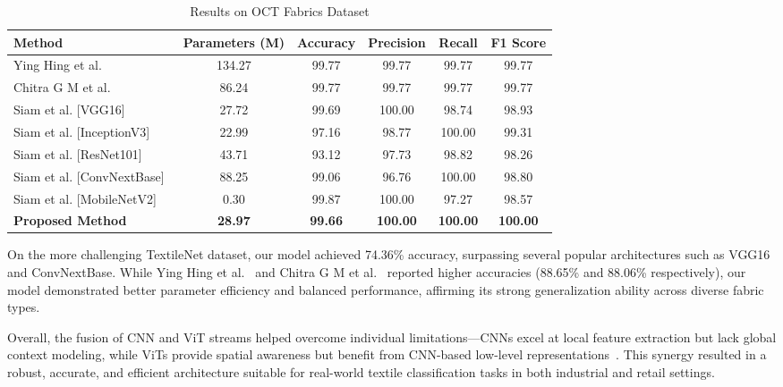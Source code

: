\begin{table}[h]
\centering
\caption{Results on OCT Fabrics Dataset}
\label{tab:oct_results}
\begin{adjustbox}{max width=\textwidth}
\begin{tabular}{lccccc}
\toprule
\textbf{Method} & \textbf{Parameters (M)} & \textbf{Accuracy} & \textbf{Precision} & \textbf{Recall} & \textbf{F1 Score} \\
\midrule
Ying Hing et al.~\cite{hong2024research} & 134.27 & 99.77 & 99.77 & 99.77 & 99.77 \\
Chitra G M et al.~\cite{chitra2023fabric} & 86.24 & 99.77 & 99.77 & 99.77 & 99.77 \\
Siam et al. [VGG16]~\cite{siam2023textilenet} & 27.72 & 99.69 & 100.00 & 98.74 & 98.93 \\
Siam et al. [InceptionV3]~\cite{siam2023textilenet} & 22.99 & 97.16 & 98.77 & 100.00 & 99.31 \\
Siam et al. [ResNet101]~\cite{siam2023textilenet} & 43.71 & 93.12 & 97.73 & 98.82 & 98.26 \\
Siam et al. [ConvNextBase]~\cite{siam2023textilenet} & 88.25 & 99.06 & 96.76 & 100.00 & 98.80 \\
Siam et al. [MobileNetV2]~\cite{siam2023textilenet} & 0.30 & 99.87 & 100.00 & 97.27 & 98.57 \\
\textbf{Proposed Method} & \textbf{28.97} & \textbf{99.66} & \textbf{100.00} & \textbf{100.00} & \textbf{100.00} \\
\bottomrule
\end{tabular}
\end{adjustbox}
\end{table}

On the more challenging TextileNet dataset, our model achieved 74.36\% accuracy, surpassing several popular architectures such as VGG16~\cite{simonyan2015vgg} and ConvNextBase. While Ying Hing et al.~\cite{hong2024research} and Chitra G M et al.~\cite{chitra2023fabric} reported higher accuracies (88.65\% and 88.06\% respectively), our model demonstrated better parameter efficiency and balanced performance, affirming its strong generalization ability across diverse fabric types.

Overall, the fusion of CNN and ViT streams helped overcome individual limitations—CNNs excel at local feature extraction but lack global context modeling, while ViTs provide spatial awareness but benefit from CNN-based low-level representations~\cite{dosovitskiy2020vit}. This synergy resulted in a robust, accurate, and efficient architecture suitable for real-world textile classification tasks in both industrial and retail settings.

